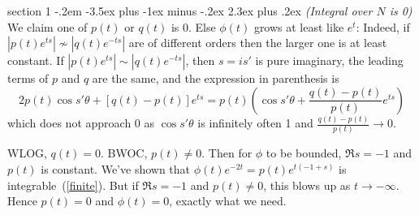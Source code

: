\documentclass[12pt]{article}
\makeatletter
\theoremstyle{norm}
\newcommand{\pa}[1]{\left( {#1} \right)}
\newcommand{\iy}[0]{\infty}
\newenvironment{problem}{\@startsection
       {section}
       {1}
       {-.2em}
       {-3.5ex plus -1ex minus -.2ex}
       {2.3ex plus .2ex}
       {\pagebreak[3]%
       \large\bf\noindent{Problem }
       }
       }
       {
       }
\makeatother
\begin{document}
\begin{problem}{\it (Integral over $N$ is 0)}
We claim one of $p(t)$ or $q(t)$ is 0. 
Else $\phi(t)$ grows at least like $e^t$: Indeed, if $|p(t)e^{ts}|\nsim|q(t)e^{-ts}|$ are of different orders then the larger one is at least constant. If $|p(t)e^{ts}|\sim|q(t)e^{-ts}|$, then $s=is'$ is pure imaginary, the leading terms of $p$ and $q$ are the same,
 and the expression in parenthesis is 
\[2p(t)\cos s'\theta+[q(t)-p(t)]e^{ts}=p(t)\pa{\cos s'\theta +\frac{q(t)-p(t)}{p(t)} e^{ts}}\]
which does not approach 0 as $\cos s'\theta $ is infinitely often 1 and $\frac{q(t)-p(t)}{p(t)}\to 0$.

WLOG, $q(t)=0$. BWOC, $p(t)\neq 0$. Then for $\phi$ to be bounded, $\Re s=-1$ and $p(t)$ is constant. 
We've shown that $\phi(t)e^{-2t}=p(t)e^{t(-1+s)}$ is integrable~(\ref{finite}). But if $\Re s=-1$ and $p(t)\ne 0$, this blows up as $t\to -\iy$. Hence $p(t)=0$ and $\phi(t)=0$, exactly what we need.

\end{problem}
\end{document}
